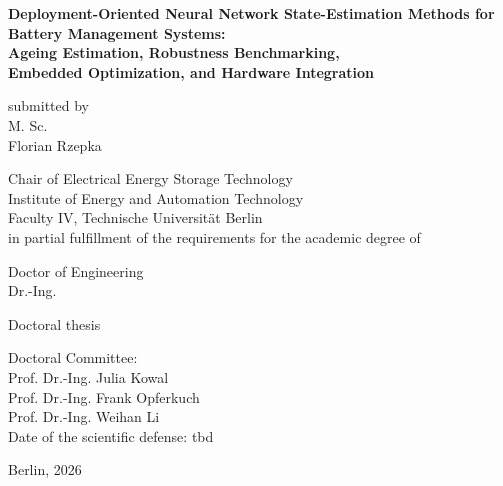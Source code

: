 \documentclass[
    a4paper,
    12pt,
    titlepage,
    bibliography=totoc,
    twoside=on,
    parskip=false,
    numbers=noenddot,
    cleardoublepage=empty,
    DIV=12,
    BCOR=12.0mm,
    headheight=36pt,
    headings=openright
]{scrreprt}
\begin{document}

\begin{titlepage}
\thispagestyle{empty}
\begin{singlespace}
\begin{center}
\vspace*{10pt}
\begin{onehalfspace}
\Huge{\textbf{Deployment-Oriented Neural Network State-Estimation Methods for Battery Management Systems:}}\\
\vspace*{10pt}
\Large{\textbf{Ageing Estimation, Robustness Benchmarking,}}\\
\Large{\textbf{Embedded Optimization, and Hardware Integration}}
\end{onehalfspace}
\vspace*{18pt}
\large{submitted by\\
M. Sc.\\
Florian Rzepka}\\
\vspace*{24pt}

\large{
Chair of Electrical Energy Storage Technology\\
Institute of Energy and Automation Technology\\
Faculty IV, Technische Universit\"at Berlin\\
in partial fulfillment of the requirements for the academic degree of\\}
\vspace{10pt}

\large{
Doctor of Engineering\\
Dr.-Ing.\\
}

\vspace{6pt}
\large{Doctoral thesis\\}
\end{center}

\vspace{6pt}
\begin{flushleft}
\normalsize{Doctoral Committee:\\}
\normalsize{Prof. Dr.-Ing. Julia Kowal\\
Prof. Dr.-Ing. Frank Opferkuch\\
Prof. Dr.-Ing. Weihan Li\\
}
\vspace{2pt}
\normalsize{Date of the scientific defense: tbd\\}
\end{flushleft}
\vspace{0pt}
\begin{center}
\normalsize{Berlin, 2026}
\end{center}
\end{singlespace}
\end{titlepage}
\end{document}
